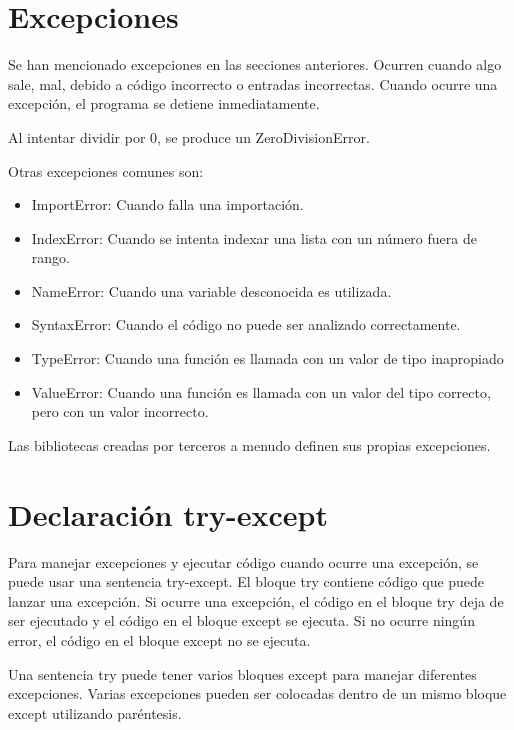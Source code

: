 \documentclass{report}
\begin{document}
{\section{Excepciones}

Se han mencionado excepciones en las secciones anteriores. Ocurren cuando algo sale, mal, debido a código incorrecto o entradas incorrectas. Cuando ocurre una excepción, el programa se detiene inmediatamente.

Al intentar dividir por 0, se produce un ZeroDivisionError.


Otras excepciones comunes son:

\begin{itemize}
  \item ImportError: Cuando falla una importación.
  \item IndexError: Cuando se intenta indexar una lista con un número fuera de rango.
  \item NameError: Cuando una variable desconocida es utilizada.
  \item SyntaxError: Cuando el código no puede ser analizado correctamente.
  \item TypeError: Cuando una función es llamada con un valor de tipo inapropiado
  \item ValueError: Cuando una función es llamada con un valor del tipo correcto, pero con un valor incorrecto.
\end{itemize}

Las bibliotecas creadas por terceros a menudo definen sus propias excepciones.

\section{Declaración try-except}

Para manejar excepciones y ejecutar código cuando ocurre una excepción, se puede usar una sentencia try-except. El bloque try contiene código que puede lanzar una excepción. Si ocurre una excepción, el código en el bloque try deja de ser ejecutado y el código en el bloque except se ejecuta. Si no ocurre ningún error, el código en el bloque except no se ejecuta.


Una sentencia try puede tener varios bloques except para manejar diferentes excepciones. Varias excepciones pueden ser colocadas dentro de un mismo bloque except utilizando paréntesis.

}
\end{document}
